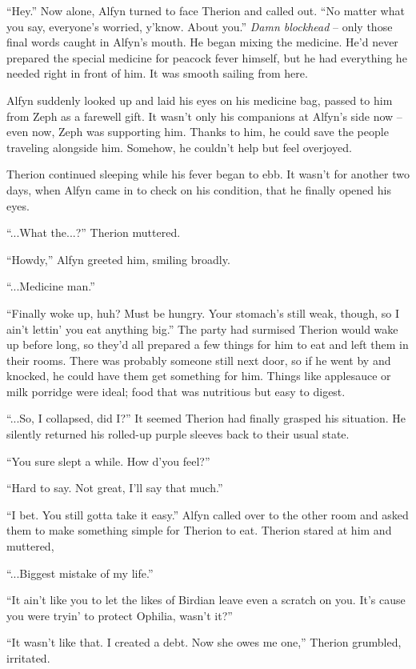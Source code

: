 ``Hey.'' Now alone, Alfyn turned to face Therion and called out. ``No matter what you say, everyone's worried, y'know. About you.'' \emph{Damn blockhead} -- only those final words caught in Alfyn's mouth. He began mixing the medicine. He'd never prepared the special medicine for peacock fever himself, but he had everything he needed right in front of him. It was smooth sailing from here.

Alfyn suddenly looked up and laid his eyes on his medicine bag, passed to him from Zeph as a farewell gift. It wasn't only his companions at Alfyn's side now -- even now, Zeph was supporting him. Thanks to him, he could save the people traveling alongside him. Somehow, he couldn't help but feel overjoyed.

Therion continued sleeping while his fever began to ebb. It wasn't for another two days, when Alfyn came in to check on his condition, that he finally opened his eyes.

``...What the...?'' Therion muttered.

``Howdy,'' Alfyn greeted him, smiling broadly.

``...Medicine man.''

``Finally woke up, huh? Must be hungry. Your stomach's still weak, though, so I ain't lettin' you eat anything big.'' The party had surmised Therion would wake up before long, so they'd all prepared a few things for him to eat and left them in their rooms. There was probably someone still next door, so if he went by and knocked, he could have them get something for him. Things like applesauce or milk porridge were ideal; food that was nutritious but easy to digest.

``...So, I collapsed, did I?'' It seemed Therion had finally grasped his situation. He silently returned his rolled-up purple sleeves back to their usual state.

``You sure slept a while. How d'you feel?''

``Hard to say. Not great, I'll say that much.''

``I bet. You still gotta take it easy.'' Alfyn called over to the other room and asked them to make something simple for Therion to eat. Therion stared at him and muttered,

``...Biggest mistake of my life.''

``It ain't like you to let the likes of Birdian leave even a scratch on you. It's cause you were tryin' to protect Ophilia, wasn't it?''

``It wasn't like that. I created a debt. Now she owes me one,'' Therion grumbled, irritated.

